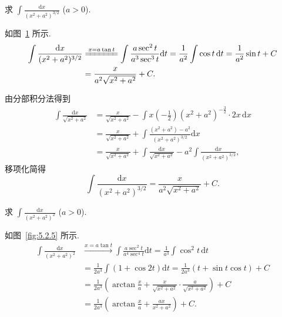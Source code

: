 \begin{example}\label{ex:5.2.6}
求 $\int\frac{\mathrm{d}x}{(x^{2}+a^{2})^{3/2}}$ ($a>0$).
\end{example}

\begin{solution}[解法 1]
如图~\ref{fig:5.2.4} 所示.
\begin{align*}
\int\frac{\mathrm{d}x}{(x^{2}+a^{2})^{3/2}}
&\xlongequal{x=a\tan t}\int\frac{a\sec^{2}t}{a^{3}\sec^{3}t}\mathrm{d}t
=\frac{1}{a^{2}}\int\cos t\,\mathrm{d}t=\frac{1}{a^{2}}\sin t+C\\
&=\frac{x}{a^{2}\sqrt{x^{2}+a^{2}}}+C.
\end{align*}
\end{solution}

\begin{solution}[解法 2]
由分部积分法得到
\begin{align*}
\int\frac{\mathrm{d}x}{\sqrt{x^{2}+a^{2}}}
&=\frac{x}{\sqrt{x^{2}+a^{2}}}-\int x\left(-\frac{1}{2}\right)(x^{2}+a^{2})^{-\frac{3}{2}}\cdot 2x\,\mathrm{d}x\\
&=\frac{x}{\sqrt{x^{2}+a^{2}}}+\int\frac{(x^{2}+a^{2})-a^{2}}{(x^{2}+a^{2})^{3/2}}\mathrm{d}x\\
&=\frac{x}{\sqrt{x^{2}+a^{2}}}+\int\frac{\mathrm{d}x}{\sqrt{x^{2}+a^{2}}}-a^{2}\int\frac{\mathrm{d}x}{(x^{2}+a^{2})^{3/2}},
\end{align*}
移项化简得
\[
\int\frac{\mathrm{d}x}{(x^{2}+a^{2})^{3/2}}=\frac{x}{a^{2}\sqrt{x^{2}+a^{2}}}+C.
\]
\end{solution}

\begin{figure}[htbp]
\centering
{}
\caption{}\label{fig:5.2.4}
\end{figure}

\begin{example}\label{ex:5.2.7}
求 $\int\frac{\mathrm{d}x}{(x^{2}+a^{2})^{2}}$ ($a>0$).
\end{example}

\begin{solution}[解法 1]
如图~\ref{fig:5.2.5} 所示.
\begin{align*}
\int\frac{\mathrm{d}x}{(x^{2}+a^{2})^{2}}
&\xrightarrow{x=a\tan t}\int\frac{a\sec^{2}t}{a^{4}\sec^{4}t}\mathrm{d}t=\frac{1}{a^{3}}\int\cos^{2}t\,\mathrm{d}t\\
&=\frac{1}{2a^{3}}\int(1+\cos 2t)\mathrm{d}t=\frac{1}{2a^{3}}(t+\sin t\cos t)+C\\
&=\frac{1}{2a^{3}}\left(\arctan\frac{x}{a}+\frac{x}{\sqrt{x^{2}+a^{2}}}\cdot\frac{a}{\sqrt{x^{2}+a^{2}}}\right)+C\\
&=\frac{1}{2a^{3}}\left(\arctan\frac{x}{a}+\frac{ax}{x^{2}+a^{2}}\right)+C.
\end{align*}
\end{solution}

